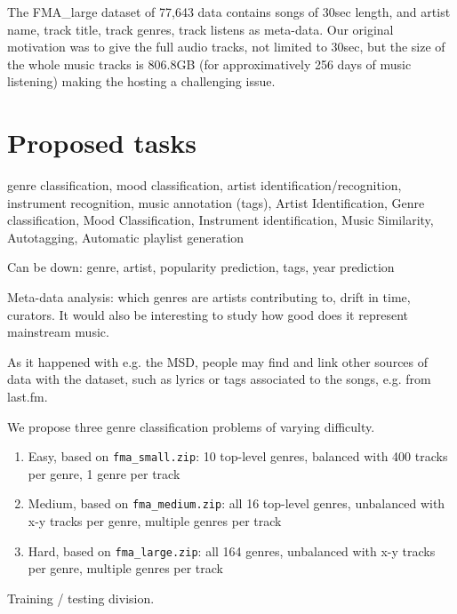 \documentclass{article}
\begin{document}
\noindent
The FMA\_large dataset of 77,643 data contains songs of 30sec length, and artist name, track title, track genres, track listens as meta-data. Our original motivation was to give the full audio tracks, not limited to 30sec, but the size of the whole music tracks is 806.8GB (for approximatively 256 days of music listening) making the hosting a challenging issue.




\section{Proposed tasks} %

genre classification, mood classification, artist identification/recognition, instrument recognition, music annotation (tags),
Artist Identification, Genre classification, Mood Classification, Instrument identification, Music Similarity, Autotagging, Automatic playlist generation

Can be down: genre, artist, popularity prediction, tags, year prediction


Meta-data analysis: which genres are artists contributing to, drift in time, curators.
It would also be interesting to study how good does it represent mainstream music.

As it happened with e.g. the MSD, people may find and link other sources of data with the dataset, such as lyrics or tags associated to the songs, e.g. from last.fm.

We propose three genre classification problems of varying difficulty.

\begin{enumerate}
	\item Easy, based on \texttt{fma\_small.zip}: 10 top-level genres, balanced with 400 tracks per genre, 1 genre per track
	\item Medium, based on \texttt{fma\_medium.zip}: all 16 top-level genres, unbalanced with x-y tracks per genre, multiple genres per track
	\item Hard, based on \texttt{fma\_large.zip}: all 164 genres, unbalanced with x-y tracks per genre, multiple genres per track
\end{enumerate}

Training / testing division.
\end{document}
